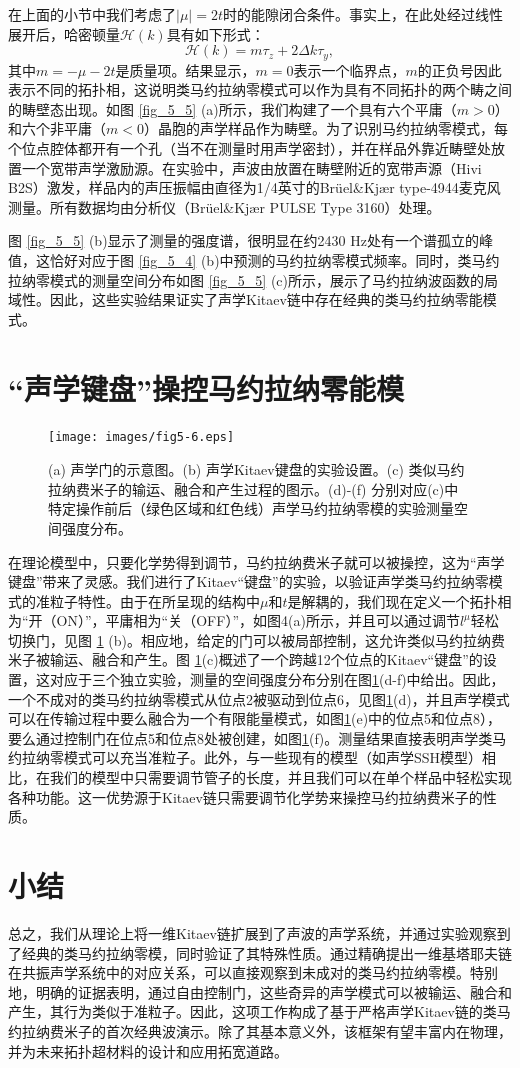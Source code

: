 在上面的小节中我们考虑了\(\vert \mu \vert = 2t\)时的能隙闭合条件。事实上，在此处经过线性展开后，哈密顿量\(\mathcal{H}(k)\)具有如下形式：
\begin{equation}\label{eq5-21}
    \mathcal{H}(k) = m\tau_{z} + 2\Delta k\tau_{y},
\end{equation}
其中\(m = -\mu - 2t\)是质量项。结果显示，\(m = 0\)表示一个临界点，\(m\)的正负号因此表示不同的拓扑相，这说明类马约拉纳零模式可以作为具有不同拓扑的两个畴之间的畴壁态出现。如图 \ref{fig_5_5} (a)所示，我们构建了一个具有六个平庸（\(m > 0\)）和六个非平庸（\(m < 0\)）晶胞的声学样品作为畴壁。为了识别马约拉纳零模式，每个位点腔体都开有一个孔（当不在测量时用声学密封），并在样品外靠近畴壁处放置一个宽带声学激励源。在实验中，声波由放置在畴壁附近的宽带声源（Hivi B2S）激发，样品内的声压振幅由直径为1/4英寸的Brüel\&Kjær type-4944麦克风测量。所有数据均由分析仪（Brüel\&Kjær PULSE Type 3160）处理。

图 \ref{fig_5_5} (b)显示了测量的强度谱，很明显在约2430 Hz处有一个谱孤立的峰值，这恰好对应于图 \ref{fig_5_4} (b)中预测的马约拉纳零模式频率。同时，类马约拉纳零模式的测量空间分布如图 \ref{fig_5_5} (c)所示，展示了马约拉纳波函数的局域性。因此，这些实验结果证实了声学Kitaev链中存在经典的类马约拉纳零能模式。

\section{“声学键盘”操控马约拉纳零能模}

\begin{figure}[h!]
    \centering
    \texttt{[image: images/fig5-6.eps]} 
    \caption{(a) 声学门的示意图。(b) 声学Kitaev键盘的实验设置。(c) 类似马约拉纳费米子的输运、融合和产生过程的图示。(d)-(f) 分别对应(c)中特定操作前后（绿色区域和红色线）声学马约拉纳零模的实验测量空间强度分布。}
    \label{fig_5_6}
\end{figure}
在理论模型中，只要化学势得到调节，马约拉纳费米子就可以被操控，这为“声学键盘”带来了灵感。我们进行了Kitaev“键盘”的实验，以验证声学类马约拉纳零模式的准粒子特性\cite{r32}。由于在所呈现的结构中\(\mu\)和\(t\)是解耦的，我们现在定义一个拓扑相为“开（ON）”，平庸相为“关（OFF）”，如图4(a)所示，并且可以通过调节\(l^{\mu}\)轻松切换门，见图 \ref{fig_5_6} (b)。相应地，给定的门可以被局部控制，这允许类似马约拉纳费米子被输运、融合和产生。图 \ref{fig_5_6}(c)概述了一个跨越12个位点的Kitaev“键盘”的设置，这对应于三个独立实验，测量的空间强度分布分别在图\ref{fig_5_6}(d-f)中给出。因此，一个不成对的类马约拉纳零模式从位点2被驱动到位点6，见图\ref{fig_5_6}(d)，并且声学模式可以在传输过程中要么融合为一个有限能量模式，如图\ref{fig_5_6}(e)中的位点5和位点8），要么通过控制门在位点5和位点8处被创建，如图\ref{fig_5_6}(f)。测量结果直接表明声学类马约拉纳零模式可以充当准粒子。此外，与一些现有的模型（如声学SSH模型）相比，在我们的模型中只需要调节管子的长度，并且我们可以在单个样品中轻松实现各种功能。这一优势源于Kitaev链只需要调节化学势来操控马约拉纳费米子的性质。

\section{小结}
总之，我们从理论上将一维Kitaev链扩展到了声波的声学系统，并通过实验观察到了经典的类马约拉纳零模，同时验证了其特殊性质。通过精确提出一维基塔耶夫链在共振声学系统中的对应关系，可以直接观察到未成对的类马约拉纳零模。特别地，明确的证据表明，通过自由控制门，这些奇异的声学模式可以被输运、融合和产生，其行为类似于准粒子。因此，这项工作构成了基于严格声学Kitaev链的类马约拉纳费米子的首次经典波演示。除了其基本意义外，该框架有望丰富内在物理，并为未来拓扑超材料的设计和应用拓宽道路。
